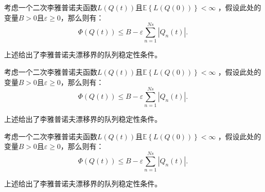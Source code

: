 \begin{CorollaryJXD}\label{Corollary1-1}
考虑一个二次李雅普诺夫函数$L\left( {Q\left( t \right)} \right)$且$\mathbb{E}\left\{ {L\left( {Q\left( 0 \right)} \right)} \right\} < \infty $ ，假设此处的变量$B > 0$且$\varepsilon  \ge 0$，那么则有：
\begin{equation}\label{Eq1-5}
\Phi \left( {Q\left( t \right)} \right) \le B - \varepsilon \sum\limits_{n = 1}^{Ns} {\left| {{Q_n}\left( t \right)} \right|}.
\end{equation}
\end{CorollaryJXD}
\vspace{0.5em}
上述给出了李雅普诺夫漂移界的队列稳定性条件。


\begin{DefinitionJXD}\label{Definition1-1}
考虑一个二次李雅普诺夫函数$L\left( {Q\left( t \right)} \right)$且$\mathbb{E}\left\{ {L\left( {Q\left( 0 \right)} \right)} \right\} < \infty $ ，假设此处的变量$B > 0$且$\varepsilon  \ge 0$，那么则有：
\begin{equation}\label{Eq_2_3}
\Phi \left( {Q\left( t \right)} \right) \le B - \varepsilon \sum\limits_{n = 1}^{Ns} {\left| {{Q_n}\left( t \right)} \right|}.
\end{equation}
\end{DefinitionJXD}
\vspace{0.5em}
上述给出了李雅普诺夫漂移界的队列稳定性条件。


\begin{PropositionJXD}\label{Proposition1-1}
考虑一个二次李雅普诺夫函数$L\left( {Q\left( t \right)} \right)$且$\mathbb{E}\left\{ {L\left( {Q\left( 0 \right)} \right)} \right\} < \infty $ ，假设此处的变量$B > 0$且$\varepsilon  \ge 0$，那么则有：
\begin{equation}\label{Eq_2_3}
\Phi \left( {Q\left( t \right)} \right) \le B - \varepsilon \sum\limits_{n = 1}^{Ns} {\left| {{Q_n}\left( t \right)} \right|}.
\end{equation}
\end{PropositionJXD}
\vspace{0.5em}
上述给出了李雅普诺夫漂移界的队列稳定性条件。


